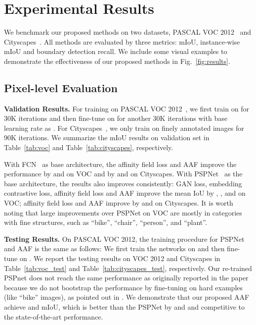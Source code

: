 \section{Experimental Results}
\label{sec:exp_results}
We benchmark our proposed methods on two datasets, PASCAL VOC 2012~\cite{everingham2010pascal} and Cityscapes~\cite{Cordts2016Cityscapes}. All methods are evaluated by three metrics: mIoU, instance-wise mIoU and boundary detection recall. We include some visual examples to demonstrate the effectiveness of our proposed methods in Fig.~\ref{fig:results}.

\subsection{Pixel-level Evaluation}
\label{sec:pix_eval}

\noindent
\textbf{Validation Results.}
For training on PASCAL VOC 2012~\cite{everingham2010pascal}, we first train on  for 30K iterations and then fine-tune on  for another 30K iterations with base learning rate as . For Cityscapes~\cite{Cordts2016Cityscapes}, we only train on finely annotated images for 90K iterations. We summarize the mIoU results on validation set in Table~\ref{tab:voc} and Table~\ref{tab:cityscapes}, respectively.

With FCN~\cite{long2015fully} as base architecture, the affinity field loss and AAF improve the performance by  and  on VOC and by  and  on Cityscapes. With PSPNet~\cite{zhao2016pyramid} as the base architecture, the results also improves consistently: GAN loss, embedding contrastive loss, affinity field loss and AAF improve the mean IoU by , ,  and  on VOC; affinity field loss and AAF improve by  and  on Cityscapes. It is worth noting that large improvements over PSPNet on VOC are mostly in categories with fine structures, such as ``bike'', ``chair'', ``person'', and ``plant''. 


\noindent
\textbf{Testing Results.}
On PASCAL VOC 2012, the training procedure for PSPNet and AAF is the same as follows: We first train the networks on  and then fine-tune on . We report the testing results on VOC 2012 and Cityscapes in Table~\ref{tab:voc_test} and Table~\ref{tab:cityscapes_test}, respectively. Our re-trained PSPnet does not reach the same performance as originally reported in the paper because we do not bootstrap the performance by fine-tuning on hard examples (like ``bike'' images), as pointed out in \cite{chen2017rethinking}. We demonstrate that our proposed AAF achieve  and  mIoU, which is better than the PSPNet by  and  and competitive to the state-of-the-art performance.\\

